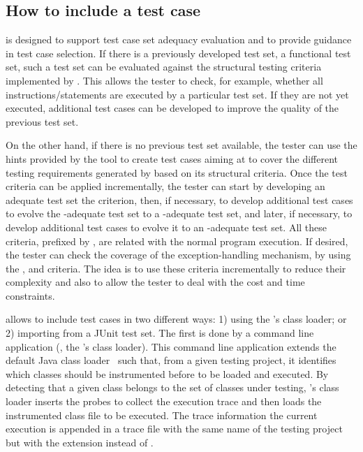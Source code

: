 \subsection{How to include a test case}\label{sec:testcase}

\toolname is designed to support test case set adequacy evaluation
and to provide guidance in test case selection. If there is a
previously developed test set, \eg a functional test set, such a
test set can be evaluated against the structural testing criteria
implemented by \toolname. This allows the tester to check, for
example, whether all instructions/statements are executed by a
particular test set. If they are not yet executed, additional test
cases can be developed to improve the quality of the previous test
set.

On the other hand, if there is no previous test set available, the
tester can use the hints provided by the tool to create test cases
aiming at to cover the different testing requirements generated by
\toolname based on its structural criteria. Once the test criteria
can be applied incrementally, the tester can start by developing
an adequate test set \wrt the  criterion, then,
if necessary, to develop additional test cases to evolve the
-adequate test set to a
-adequate test set, and later, if necessary, to
develop additional test cases to evolve it to an
-adequate test set. All these criteria, prefixed
by , are related with the normal program execution.
If desired, the tester can check the coverage of the
exception-handling mechanism, by using the ,
 and  criteria. The idea is to
use these criteria incrementally to reduce their complexity and
also to allow the tester to deal with the cost and time
constraints.

\begin{sloppypar}
\toolname allows to include test cases in two different ways: 1)
using the \toolname's class loader; or 2) importing from a JUnit
test set. The first is done by a command line application
(, the \toolname's class loader). This
command line application extends the default Java class
loader~\cite{Lindholm99JVMS} such that, from a given testing
project, it identifies which classes should be instrumented before
to be loaded and executed. By detecting that a given class belongs
to the set of classes under testing, \toolname's class loader
inserts the probes to collect the execution trace and then loads
the instrumented class file to be executed. The trace information
\wrt the current execution is appended in a trace file with the
same name of the testing project but with the extension \trcext
instead of \prjext.
\end{sloppypar}

